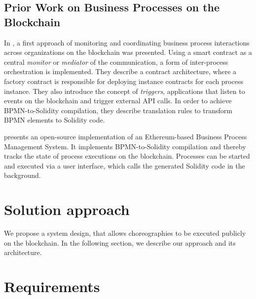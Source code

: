 \documentclass[runningheads]{llncs}
\begin{document}
\subsection{Prior Work on Business Processes on the Blockchain}
In \cite{weber2016untrusted}, a first approach of monitoring and coordinating business process interactions across organizations on the blockchain was presented.
Using a smart contract as a central \emph{monitor} or \emph{mediator} of the communication, a form of inter-process orchestration is implemented.
They describe a contract architecture, where a factory contract is responsible for deploying instance contracts for each process instance.
They also introduce the concept of \emph{triggers}, applications that listen to events on the blockchain and trigger external API calls.
In order to achieve BPMN-to-Solidity compilation, they describe translation rules to transform BPMN elements to Solidity code.



\cite{lopez2017caterpillar} presents an open-source implementation of an Ethereum-based Business Process Management System.
It implements BPMN-to-Solidity compilation and thereby tracks the state of process executions on the blockchain.
Processes can be started and executed via a user interface, which calls the generated Solidity code in the background.


\section{Solution approach}
We propose a system design, that allows choreographies to be executed publicly on the blockchain.
In the following section, we describe our approach and its architecture.

\section{Requirements}
\end{document}
